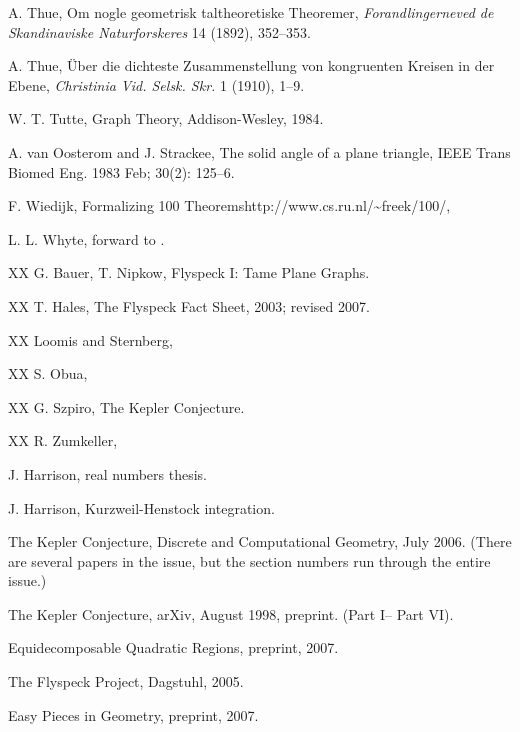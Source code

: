 \begin{thebibliography}{CHMS94}
 A. Thue, Om nogle geometrisk taltheoretiske Theoremer,
    {\it Forandlingerneved de Skandinaviske Naturforskeres} 14 (1892), 352--353.

 A. Thue, \"Uber die dichteste Zusammenstellung von
    kongruenten Kreisen in der Ebene, {\it Christinia Vid. Selsk. Skr.} 1
    (1910), 1--9.

 W. T. Tutte, Graph Theory, Addison-Wesley, 1984.

 A. van Oosterom and J. Strackee, The solid
angle of a plane triangle, IEEE Trans Biomed Eng. 1983 Feb; 30(2):
125--6.

 F. Wiedijk, Formalizing 100
Theorems\hfil\break http://www.cs.ru.nl/\~{\hbox{}}freek/100/,

 L. L. Whyte, forward to \cite{Kep66}.


  XX G. Bauer, T. Nipkow, Flyspeck I: Tame Plane Graphs.

  XX T. Hales, The Flyspeck Fact Sheet, 2003; revised
2007.

  XX Loomis and Sternberg,

 XX S. Obua,

 XX G. Szpiro,  The Kepler Conjecture.

 XX R. Zumkeller,

 J. Harrison, real numbers thesis.

 J. Harrison, Kurzweil-Henstock integration.

 The Kepler Conjecture, Discrete and
Computational Geometry, July 2006. (There are several papers in
the issue, but the section numbers run through the entire issue.)

 The Kepler Conjecture, arXiv, August 1998,
preprint. (Part I-- Part VI).

 Equidecomposable Quadratic Regions,
preprint, 2007.

  The Flyspeck Project, Dagstuhl, 2005.

 Easy Pieces in Geometry, preprint, 2007.

\end{thebibliography}
